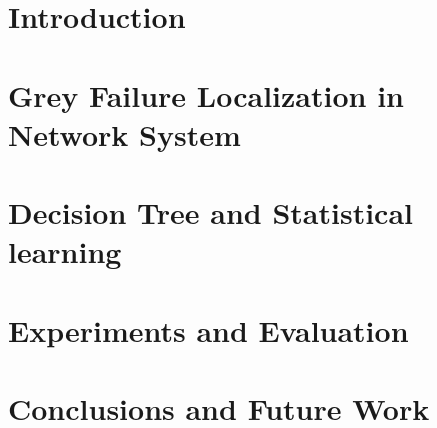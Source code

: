 \documentclass[conference]{IEEEtran}
\begin{document}


\begin{abstract}

\end{abstract}

\section{Introduction}
\label{sec:introduction}


\section{Grey Failure Localization in Network System}
\label{sec:failure}


\section{Decision Tree and Statistical learning}
\label{sec:sl}


\section{Experiments and Evaluation}
\label{sec:evaluation}


\section{Conclusions and Future Work}
\label{sec:future}





%

\end{document}
